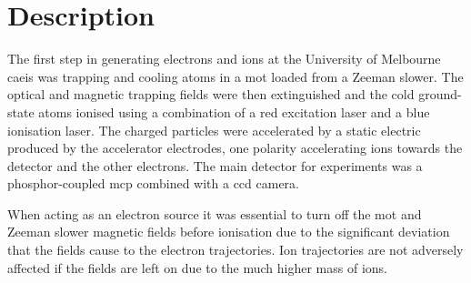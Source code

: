 \section{Description}
The first step in generating electrons and ions at the University of Melbourne \gls{caeis} was trapping and cooling atoms in a \gls{mot} loaded from a Zeeman slower.
The optical and magnetic trapping fields were then extinguished and the cold ground-state atoms ionised using a combination of a red excitation laser and a blue ionisation laser.
The charged particles were accelerated by a static electric produced by the accelerator electrodes, one polarity accelerating ions towards the detector and the other electrons.
The main detector for experiments was a phosphor-coupled \gls{mcp} combined with a \gls{ccd} camera.

When acting as an electron source it was essential to turn off the \gls{mot} and Zeeman slower magnetic fields before ionisation due to the significant deviation that the fields cause to the electron trajectories.
Ion trajectories are not adversely affected if the fields are left on due to the much higher mass of ions.


